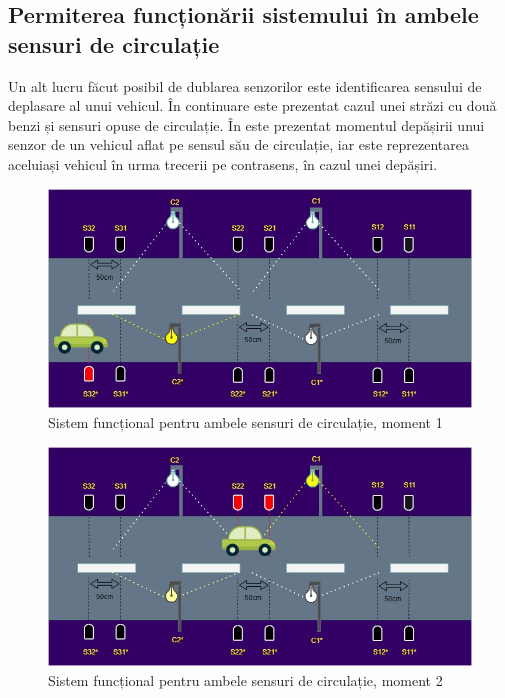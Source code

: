 \subsection{Permiterea funcționării sistemului în ambele sensuri de circulație} \label{rev}
Un alt lucru făcut posibil de dublarea senzorilor este identificarea sensului de deplasare al unui vehicul. În continuare este prezentat cazul unei străzi cu două benzi și sensuri opuse de circulație. În  este prezentat momentul depășirii unui senzor de un vehicul aflat pe sensul său de circulație, iar  este reprezentarea aceluiași vehicul în urma trecerii pe contrasens, în cazul unei depășiri. 
\begin{figure}[!ht]
    \begin{center}
    \includegraphics[width=\linewidth,keepaspectratio]{pics/dep1.jpg}
    \end{center}
    \caption{Sistem funcțional pentru ambele sensuri de circulație, moment 1}
    \label{fig:dep1}
\end{figure}

\begin{figure}[!ht]
    \begin{center}
    \includegraphics[width=\linewidth,keepaspectratio]{pics/dep2.jpg}
    \end{center}
    \caption{Sistem funcțional pentru ambele sensuri de circulație, moment 2}
    \label{fig:dep2}
\end{figure}

